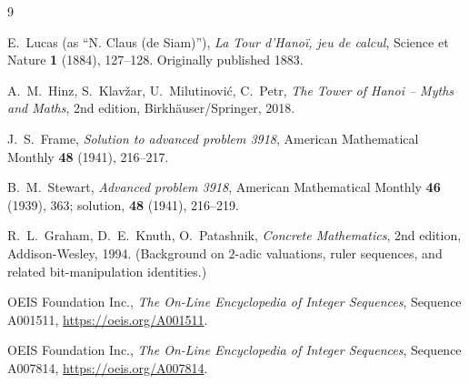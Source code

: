 \documentclass[11pt]{article}
\begin{document}
\begin{thebibliography}{9}

E.~Lucas (as ``N. Claus (de Siam)''),
\emph{La Tour d'Hano\"i, jeu de calcul},
Science et Nature \textbf{1} (1884), 127--128. Originally published 1883.

A.~M.~Hinz, S.~Klav\v{z}ar, U.~Milutinovi\'c, C.~Petr,
\emph{The Tower of Hanoi -- Myths and Maths}, 2nd edition,
Birkh\"auser/Springer, 2018.

J.~S.~Frame,
\emph{Solution to advanced problem 3918},
American Mathematical Monthly \textbf{48} (1941), 216--217.

B.~M.~Stewart,
\emph{Advanced problem 3918},
American Mathematical Monthly \textbf{46} (1939), 363;
solution, \textbf{48} (1941), 216--219.

R.~L.~Graham, D.~E.~Knuth, O.~Patashnik,
\emph{Concrete Mathematics}, 2nd edition, Addison-Wesley, 1994.
(Background on $2$-adic valuations, ruler sequences, and related
bit-manipulation identities.)

OEIS Foundation Inc.,
\emph{The On-Line Encyclopedia of Integer Sequences},
Sequence A001511, \url{https://oeis.org/A001511}.

OEIS Foundation Inc.,
\emph{The On-Line Encyclopedia of Integer Sequences},
Sequence A007814, \url{https://oeis.org/A007814}.

\end{thebibliography}
\end{document}
